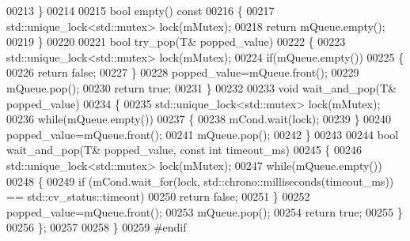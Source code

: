 \begin{DoxyCode}
00213     \}
00214 
00215     \textcolor{keywordtype}{bool} empty()\textcolor{keyword}{ const}
00216 \textcolor{keyword}{    }\{
00217         std::unique\_lock<std::mutex> lock(mMutex);
00218         \textcolor{keywordflow}{return} mQueue.empty();
00219     \}
00220 
00221     \textcolor{keywordtype}{bool} try_pop(T& popped\_value)
00222     \{
00223         std::unique\_lock<std::mutex> lock(mMutex);
00224         \textcolor{keywordflow}{if}(mQueue.empty())
00225         \{
00226             \textcolor{keywordflow}{return} \textcolor{keyword}{false};
00227         \}
00228         popped\_value=mQueue.front();
00229         mQueue.pop();
00230         \textcolor{keywordflow}{return} \textcolor{keyword}{true};
00231     \}
00232 
00233     \textcolor{keywordtype}{void} wait_and_pop(T& popped\_value)
00234     \{
00235         std::unique\_lock<std::mutex> lock(mMutex);
00236         \textcolor{keywordflow}{while}(mQueue.empty())
00237         \{
00238             mCond.wait(lock);
00239         \}
00240         popped\_value=mQueue.front();
00241         mQueue.pop();
00242     \}
00243 
00244     \textcolor{keywordtype}{bool} wait_and_pop(T& popped\_value, \textcolor{keyword}{const} \textcolor{keywordtype}{int} timeout_ms)
00245     \{
00246         std::unique\_lock<std::mutex> lock(mMutex);
00247         \textcolor{keywordflow}{while}(mQueue.empty())
00248         \{
00249             \textcolor{keywordflow}{if} (mCond.wait\_for(lock, std::chrono::milliseconds(timeout\_ms)) == std::cv\_status::timeout)
00250                 \textcolor{keywordflow}{return} \textcolor{keyword}{false};
00251         \}
00252         popped\_value=mQueue.front();
00253         mQueue.pop();
00254         \textcolor{keywordflow}{return} \textcolor{keyword}{true};
00255     \}
00256 \};
00257 
00258 \}
00259 \textcolor{preprocessor}{#endif}
\end{DoxyCode}
